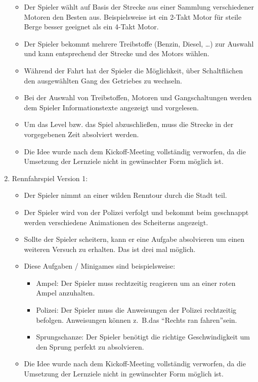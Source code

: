 \begin{enumerate}
\begin{itemize}
			\item{Der Spieler wählt auf Basis der Strecke aus einer Sammlung verschiedener Motoren den Besten aus. Beispielsweise ist ein 2-Takt Motor für steile Berge besser geeignet als ein 4-Takt Motor.}
			\item{Der Spieler bekommt mehrere Treibstoffe (Benzin, Diesel, \dots) zur Auswahl und kann entsprechend der Strecke und des Motors wählen.}
			\item{Während der Fahrt hat der Spieler die Möglichkeit, über Schaltflächen den ausgewählten Gang des Getriebes zu wechseln.}
			\item{Bei der Auswahl von Treibstoffen, Motoren und Gangschaltungen werden dem Spieler Informationstexte angezeigt und vorgelesen.}
			\item{Um das Level bzw. das Spiel abzuschließen, muss die Strecke in der vorgegebenen Zeit absolviert werden.}
			\item{Die Idee wurde nach dem Kickoff-Meeting vollständig verworfen, da die Umsetzung der Lernziele nicht in gewünschter Form möglich ist.}
		\end{itemize}
		\item{Rennfahrspiel Version 1:}
		\begin{itemize}
			\item{Der Spieler nimmt an einer wilden Renntour durch die Stadt teil.}
			\item{Der Spieler wird von der Polizei verfolgt und bekommt beim geschnappt werden verschiedene Animationen des Scheiterns angezeigt.}
			\item{Sollte der Spieler scheitern, kann er eine Aufgabe absolvieren um einen weiteren Versuch zu erhalten. Das ist drei mal möglich.}
			\item{Diese Aufgaben / Minigames sind beispielsweise:}
			\begin{itemize}
				\item{Ampel: Der Spieler muss rechtzeitig reagieren um an einer roten Ampel anzuhalten.}
				\item{Polizei: Der Spieler muss die Anweisungen der Polizei rechtzeitig befolgen. Anweisungen können z.~B.\@ das \enquote{Rechts ran fahren}sein.}
				\item{Sprungschanze: Der Spieler benötigt die richtige Geschwindigkeit um den Sprung perfekt zu absolvieren.}
			\end{itemize}
			\item{Die Idee wurde nach dem Kickoff-Meeting vollständig verworfen, da die Umsetzung der Lernziele nicht in gewünschter Form möglich ist.}
		\end{itemize}
	\end{enumerate}
